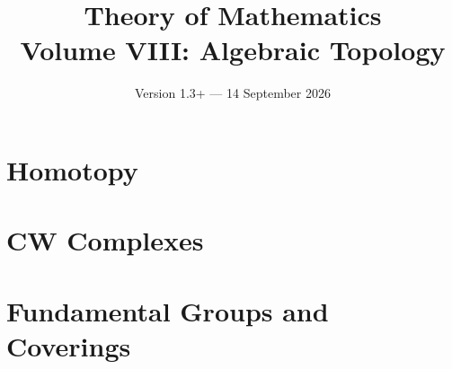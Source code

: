 \documentclass[11pt,a4paper,openany]{book}
\title{Theory of Mathematics\\[0.5em]\Large Volume VIII: Algebraic Topology}
\author{}
\date{Version 1.3+ --- 14 September 2026}
\begin{document}
\maketitle
\clearpage
\frontmatter
\tableofcontents


\mainmatter

\part{Homotopy}





\part{CW Complexes}





\part{Fundamental Groups and Coverings}






\end{document}
